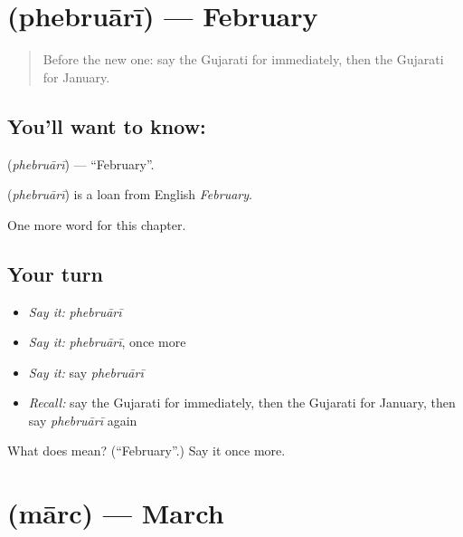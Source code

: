 \section[\texorpdfstring{\gu{ફેબ્રુઆરી} (phebruārī)}{ફેબ્રુઆરી (phebruārī)}]{ (phebruārī) — February}

\label{lesson:GU-C95-phebruari}



\begin{quote}
Before the new one: say the Gujarati for immediately, then the Gujarati for January.
\end{quote}

\subsection*{You'll want to know: }
\textbf{} (\emph{phebruārī}) — \textquotedblleft{}February\textquotedblright{}.

\begin{cousinweb}
\textbf{} (\emph{phebruārī}) is a loan from English \emph{February}.
\end{cousinweb}

\begin{grammarlens}[title={What you've built}]
One more word for this chapter.
\end{grammarlens}

\subsection*{Your turn}
\begin{itemize}
\raggedright
  \item \emph{Say it:} \emph{phebruārī}
  \item \emph{Say it:} \emph{phebruārī}, once more
  \item \emph{Say it:} say \emph{phebruārī}
  \item \emph{Recall:} say the Gujarati for immediately, then the Gujarati for January, then say \emph{phebruārī} again
\end{itemize}

\begin{tcolorbox}[breakable,colback=teal!4,colframe=teal!35!black,title={Before you move on}]
What does  mean? (\textquotedblleft{}February\textquotedblright{}.) Say it once more.
\end{tcolorbox}
\section[\texorpdfstring{\gu{માર્ચ} (mārc)}{માર્ચ (mārc)}]{ (mārc) — March}

